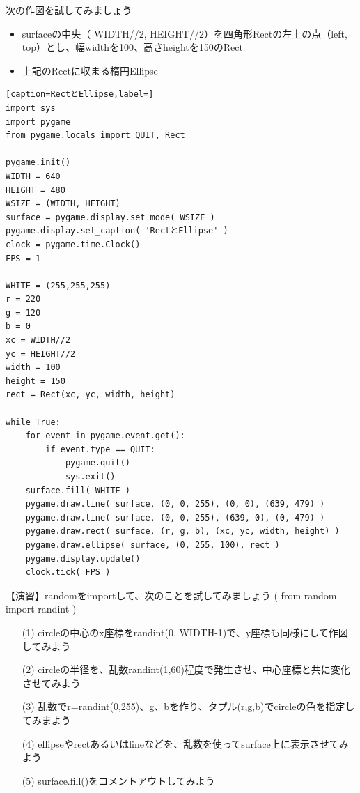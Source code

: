 \documentclass[uplatex,a4paper,11pt,oneside,openany]{jsbook}
\begin{document}
次の作図を試してみましょう
\begin{itemize}
\item surfaceの中央（ WIDTH//2, HEIGHT//2）を四角形Rectの左上の点（left, top）とし、幅widthを100、高さheightを150のRect
\item 上記のRectに収まる楕円Ellipse
\end{itemize}

\begin{lstlisting}[caption=RectとEllipse,label=]
import sys
import pygame
from pygame.locals import QUIT, Rect

pygame.init()
WIDTH = 640
HEIGHT = 480
WSIZE = (WIDTH, HEIGHT)
surface = pygame.display.set_mode( WSIZE )
pygame.display.set_caption( 'RectとEllipse' )
clock = pygame.time.Clock()
FPS = 1

WHITE = (255,255,255)
r = 220
g = 120
b = 0
xc = WIDTH//2
yc = HEIGHT//2
width = 100
height = 150
rect = Rect(xc, yc, width, height)

while True:
    for event in pygame.event.get():
        if event.type == QUIT:
            pygame.quit()
            sys.exit()
    surface.fill( WHITE )
    pygame.draw.line( surface, (0, 0, 255), (0, 0), (639, 479) )
    pygame.draw.line( surface, (0, 0, 255), (639, 0), (0, 479) )
    pygame.draw.rect( surface, (r, g, b), (xc, yc, width, height) )
    pygame.draw.ellipse( surface, (0, 255, 100), rect )
    pygame.display.update()
    clock.tick( FPS )
\end{lstlisting}

【演習】randomをimportして、次のことを試してみましょう
( from random import randint )
\begin{enumerate}
\item[(1)] circleの中心のx座標をrandint(0, WIDTH-1)で、y座標も同様にして作図してみよう
\item[(2)] circleの半径を、乱数randint(1,60)程度で発生させ、中心座標と共に変化させてみよう
\item[(3)] 乱数でr=randint(0,255)、g、bを作り、タプル(r,g,b)でcircleの色を指定してみまよう
\item[(4)] ellipseやrectあるいはlineなどを、乱数を使ってsurface上に表示させてみよう
\item[(5)] surface.fill()をコメントアウトしてみよう
\end{enumerate}%
\end{document}
